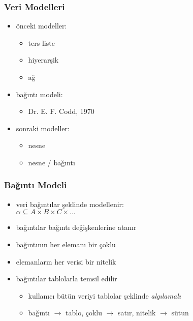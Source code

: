 \documentclass[dvipsnames]{beamer}
\theoremstyle{definition}
\theoremstyle{example}
\theoremstyle{plain}
\begin{document}
\begin{frame}
  \frametitle{Veri Modelleri}

  \begin{itemize}
    \item önceki modeller:
    \begin{itemize}
      \item ters liste
      \item hiyerarşik
      \item ağ
    \end{itemize}

    \pause
    \item bağıntı modeli:
    \begin{itemize}
      \item Dr. E. F. Codd, 1970
    \end{itemize}

    \pause
    \item sonraki modeller:
    \begin{itemize}
      \item nesne
      \item nesne / bağıntı
    \end{itemize}
  \end{itemize}
\end{frame}

\begin{frame}
  \frametitle{Bağıntı Modeli}

  \begin{itemize}
    \item veri \alert{bağıntılar} şeklinde modellenir:\\
      $\alpha \subseteq A \times B \times C \times ...$

    \pause
    \medskip
    \item bağıntılar \alert{bağıntı değişkenlerine} atanır
    \item bağıntının her elemanı bir \alert{çoklu}
    \item elemanların her verisi bir \alert{nitelik}

    \pause
    \medskip
    \item bağıntılar tablolarla temsil edilir
    \begin{itemize}
      \item kullanıcı bütün veriyi tablolar şeklinde \emph{algılamalı}
      \item bağıntı $\rightarrow$ tablo, çoklu $\rightarrow$ satır,
        nitelik $\rightarrow$ sütun
    \end{itemize}
  \end{itemize}
\end{frame}
\end{document}
